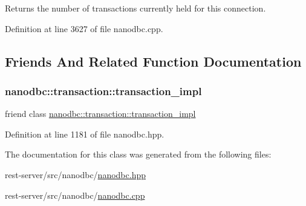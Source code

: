 Returns the number of transactions currently held for this connection. 



Definition at line 3627 of file nanodbc.\+cpp.



\subsection{Friends And Related Function Documentation}
\mbox{\label{classnanodbc_1_1connection_a81c6edeae265bb1c87fcb10a9a73da73}} 
\subsubsection{\texorpdfstring{nanodbc::transaction::transaction\_impl}{nanodbc::transaction::transaction\_impl}}
{\footnotesize\ttfamily friend class \mbox{\hyperlink{classnanodbc_1_1transaction_1_1transaction__impl}{nanodbc\+::transaction\+::transaction\+\_\+impl}}\hspace{0.3cm}{\ttfamily [friend]}}



Definition at line 1181 of file nanodbc.\+hpp.



The documentation for this class was generated from the following files\+:\begin{DoxyCompactItemize}
\item 
rest-\/server/src/nanodbc/\mbox{\hyperlink{nanodbc_8hpp}{nanodbc.\+hpp}}\item 
rest-\/server/src/nanodbc/\mbox{\hyperlink{nanodbc_8cpp}{nanodbc.\+cpp}}\end{DoxyCompactItemize}

